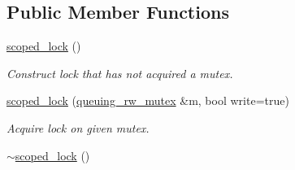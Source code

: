 \subsection*{Public Member Functions}
\begin{DoxyCompactItemize}
\item 
\hyperlink{classtbb_1_1queuing__rw__mutex_1_1scoped__lock_a1ae3792726dcff8da1f2c5366fb2b754}{scoped\+\_\+lock} ()
\begin{DoxyCompactList}\small\item\em Construct lock that has not acquired a mutex. \end{DoxyCompactList}\item 
\hypertarget{classtbb_1_1queuing__rw__mutex_1_1scoped__lock_af1b55ca1839c9c7c2cd779cd2dd9c474}{}\hyperlink{classtbb_1_1queuing__rw__mutex_1_1scoped__lock_af1b55ca1839c9c7c2cd779cd2dd9c474}{scoped\+\_\+lock} (\hyperlink{classtbb_1_1queuing__rw__mutex}{queuing\+\_\+rw\+\_\+mutex} \&m, bool write=true)\label{classtbb_1_1queuing__rw__mutex_1_1scoped__lock_af1b55ca1839c9c7c2cd779cd2dd9c474}

\begin{DoxyCompactList}\small\item\em Acquire lock on given mutex. \end{DoxyCompactList}\item 
\hypertarget{classtbb_1_1queuing__rw__mutex_1_1scoped__lock_a6cb16cc55f884bbbd5a69430c47b288f}{}\hyperlink{classtbb_1_1queuing__rw__mutex_1_1scoped__lock_a6cb16cc55f884bbbd5a69430c47b288f}{$\sim$scoped\+\_\+lock} ()\label{classtbb_1_1queuing__rw__mutex_1_1scoped__lock_a6cb16cc55f884bbbd5a69430c47b288f}


\end{DoxyCompactItemize}
